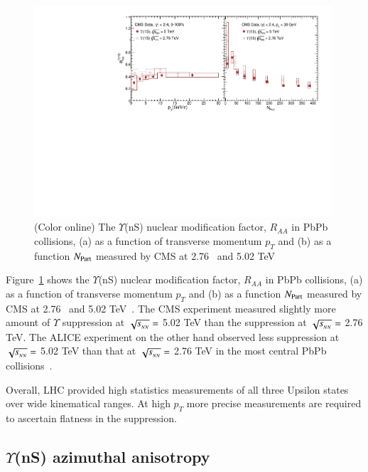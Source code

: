 \begin{figure}
  \includegraphics[width=0.99\textwidth]{Figures/ExpOverview/Fig_CMS_Y1SRAAPtNPart_En.pdf}
  \caption{(Color online) The $\Upsilon$(nS) nuclear modification factor, $R_{AA}$ in PbPb collisions,
    (a) as a function of transverse momentum $p_{T}$
    and (b) as a function $N_{\rm Part}$ measured by CMS 
    at 2.76~\cite{Khachatryan:2016xxp} and 5.02 TeV~\cite{CMS:2018zza}
  }
  \label{fig:LHCYnSRAAenergy}
\end{figure}




Figure~\ref{fig:LHCYnSRAAenergy} shows 
the $\Upsilon$(nS) nuclear modification factor, $R_{AA}$ in PbPb collisions,
(a) as a function of transverse momentum $p_{T}$
  and (b) as a function $N_{\rm Part}$ measured by CMS
    at 2.76~\cite{Khachatryan:2016xxp} and 5.02 TeV~\cite{CMS:2018zza}. 
 The CMS experiment measured slightly more amount of $\Upsilon$ suppression at
 $\sqrt{s_{_{NN}}} =$ 5.02 TeV than the suppression at $\sqrt{s_{_{NN}}} =$ 2.76 TeV.
 The ALICE experiment on the other hand observed less
suppression at $\sqrt{s_{_{NN}}} =$ 5.02 TeV than that at $\sqrt{s_{_{NN}}} =$ 2.76 TeV 
in the most central PbPb collisions~\cite{ALICE:2018wzm,Abelev:2014nua}. 
  
Overall, LHC provided high statistics measurements of all three
Upsilon states over wide kinematical ranges. At high $p_T$ more precise
measurements are required to ascertain flatness in the suppression. 


    
    
\subsection{$\Upsilon$(nS) azimuthal anisotropy}


